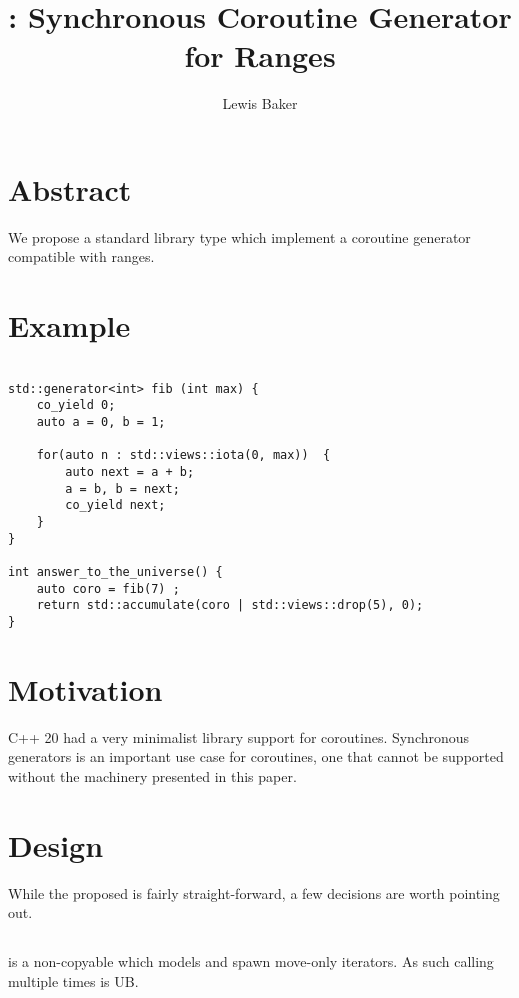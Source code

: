 \documentclass{wg21}
\title{\tcode{std::generator}: Synchronous Coroutine Generator for Ranges}
\author{Lewis Baker}{lbaker@fb.com }
\begin{document}
\maketitle


\section{Abstract}

We propose a standard library type  which implement a coroutine generator compatible with ranges.

\section{Example}
\begin{lstlisting}[style=color]

std::generator<int> fib (int max) {
    co_yield 0;
    auto a = 0, b = 1;
    
    for(auto n : std::views::iota(0, max))  {
        auto next = a + b;
        a = b, b = next;
        co_yield next;
    }
}

int answer_to_the_universe() {
    auto coro = fib(7) ;
    return std::accumulate(coro | std::views::drop(5), 0);
}

\end{lstlisting}

\section{Motivation}

C++ 20 had a very minimalist library support for coroutines.
Synchronous generators is an important use case for coroutines, one that cannot be supported without 
the machinery presented in this paper.

 
\section{Design}

While the proposed  is fairly straight-forward, a few decisions are worth pointing out.

\subsection{}

 is a non-copyable  which models  and spawn move-only iterators.
As such calling  multiple times is UB.
\end{document}
